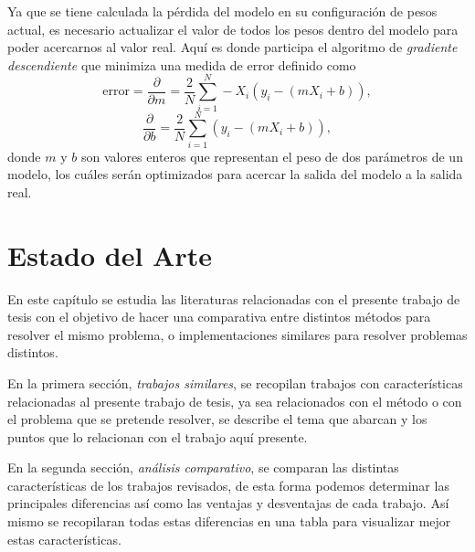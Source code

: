 Ya que se tiene calculada la pérdida del modelo en su configuración de pesos actual, es necesario actualizar el valor de todos los pesos dentro del modelo para poder acercarnos al valor real. Aquí es donde participa el algoritmo de \emph{gradiente descendiente} \citep{alg:gradient} que minimiza una medida de error definido como
\begin{equation}
        \text{error} = \frac{\partial}{\partial m} = \frac{2}{N}\sum_{i=1}^{N}-X_i(y_i-(mX_i+b)),
\end{equation}
\begin{equation}
        \frac{\partial}{\partial b} = \frac{2}{N}\sum_{i=1}^{N}(y_i-(mX_i+b)),
\end{equation}
donde $m$ y $b$ son valores enteros que representan el peso de dos parámetros de un modelo, los cuáles serán optimizados para acercar la salida del modelo a la salida real.

%
%           


\chapter{Estado del Arte}
En este capítulo se estudia las literaturas relacionadas con el presente trabajo de tesis con el objetivo de hacer una comparativa entre distintos métodos para resolver el mismo problema, o implementaciones similares para resolver problemas distintos.

En la primera sección, \emph{trabajos similares}, se recopilan trabajos con características relacionadas al presente trabajo de tesis, ya sea relacionados con el método o con el problema que se pretende resolver, se describe el tema que abarcan y los puntos que lo relacionan con el trabajo aquí presente.

En la segunda sección, \emph{análisis comparativo}, se comparan las distintas características de los trabajos revisados, de esta forma podemos determinar las principales diferencias así como las ventajas y desventajas de cada trabajo. Así mismo se recopilaran todas estas diferencias en una tabla para visualizar mejor estas características.

